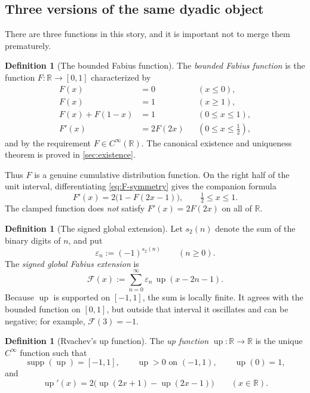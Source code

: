 \documentclass[11pt]{article}
\numberwithin{equation}{section}
\theoremstyle{definition}
\newtheorem{definition}[theorem]{Definition}
\theoremstyle{remark}
\DeclareMathOperator{\supp}{supp}
\newcommand{\R}{\mathbb R}
\newcommand{\GF}{\mathcal F}
\newcommand{\upf}{\operatorname{up}}
\newcommand{\eps}{\varepsilon}
\begin{document}
\subsection{Three versions of the same dyadic object}

There are three functions in this story, and it is important not to merge them prematurely.

\begin{definition}[The bounded Fabius function]
The \emph{bounded Fabius function} is the function $F:\R\to[0,1]$ characterized by
\begin{align}
 F(x)&=0 &&(x\le 0),\label{eq:F-left-clamp}\\
 F(x)&=1 &&(x\ge 1),\label{eq:F-right-clamp}\\
 F(x)+F(1-x)&=1 &&(0\le x\le1),\label{eq:F-symmetry}\\
 F'(x)&=2F(2x) &&(0\le x\le\tfrac12),\label{eq:F-diff}
\end{align}
and by the requirement $F\in C^\infty(\R)$.  The canonical existence and uniqueness theorem is proved in \cref{sec:existence}.
\end{definition}

Thus $F$ is a genuine cumulative distribution function.  On the right half of the unit interval, differentiating \eqref{eq:F-symmetry} gives the companion formula
\begin{equation}\label{eq:F-right-derivative}
 F'(x)=2\bigl(1-F(2x-1)\bigr),\qquad \tfrac12\le x\le1.
\end{equation}
The clamped function does \emph{not} satisfy $F'(x)=2F(2x)$ on all of $\R$.

\begin{definition}[The signed global extension]
Let $s_2(n)$ denote the sum of the binary digits of $n$, and put
\begin{equation}\label{eq:thue-morse-sign}
 \eps_n:=(-1)^{s_2(n)}\qquad(n\ge0).
\end{equation}
The \emph{signed global Fabius extension} is
\begin{equation}\label{eq:global-F-def}
 \GF(x):=\sum_{n=0}^{\infty}\eps_n\,\upf(x-2n-1).
\end{equation}
Because $\upf$ is supported on $[-1,1]$, the sum is locally finite.  It agrees with the bounded function on $[0,1]$, but outside that interval it oscillates and can be negative; for example, $\GF(3)=-1$.
\end{definition}

\begin{definition}[Rvachev's up function]
The \emph{up function} $\upf:\R\to\R$ is the unique $C^\infty$ function such that
\begin{equation}\label{eq:up-basic}
 \supp(\upf)=[-1,1],\qquad \upf>0\text{ on }(-1,1),\qquad \upf(0)=1,
\end{equation}
and
\begin{equation}\label{eq:up-differential}
 \upf'(x)=2\bigl(\upf(2x+1)-\upf(2x-1)\bigr)
 \qquad(x\in\R).
\end{equation}
\end{definition}
\end{document}

